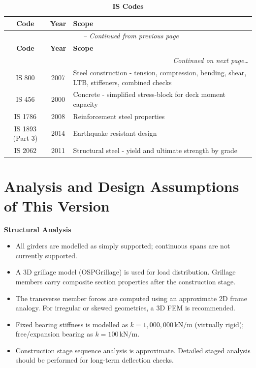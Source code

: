\documentclass[12pt,a4paper]{report}
\numberwithin{table}{chapter}
\numberwithin{figure}{chapter}
\begin{document}
\begingroup
\setlength{\tabcolsep}{3.5pt}
\begin{longtable}{|c|c|p{12cm}|}
\caption{\textbf{IS Codes}}\label{tab:is-codes}\\
\hline
\textbf{Code} & \textbf{Year} & \textbf{Scope} \\[6pt]
\hline
\endfirsthead

\multicolumn{3}{c}{\small\textit{\tablename\ \thetable{} -- Continued from previous page}} \\[4pt]
\hline
\textbf{Code} & \textbf{Year} & \textbf{Scope} \\[6pt]
\hline
\endhead

\hline
\multicolumn{3}{|r|}{\footnotesize\textit{Continued on next page\dots}} \\
\hline
\endfoot

\hline
\endlastfoot

IS 800 & 2007 & Steel construction - tension, compression, bending, shear, LTB, stiffeners, combined checks \\
\hline
IS 456 & 2000 & Concrete - simplified stress-block for deck moment capacity \\
\hline
IS 1786 & 2008 & Reinforcement steel properties \\
\hline
IS 1893 (Part 3) & 2014 & Earthquake resistant design \\
\hline
IS 2062 & 2011 & Structural steel - yield and ultimate strength by grade \\
\end{longtable}

\endgroup

\clearpage
\section{Analysis and Design Assumptions of This Version}
\label{sec:assumptions}

\textbf{Structural Analysis}

\begin{itemize}
    \item All girders are modelled as simply supported; continuous spans are not currently supported.
    \item A 3D grillage model (OSPGrillage) is used for load distribution. Grillage members carry composite section properties after the construction stage.
    \item The transverse member forces are computed using an approximate 2D frame analogy. For irregular or skewed geometries, a 3D FEM is recommended.
    \item Fixed bearing stiffness is modelled as $k = 1{,}000{,}000 \,\text{kN/m}$ (virtually rigid); free/expansion bearing as $k = 100 \, \text{kN/m}$.
    \item Construction stage sequence analysis is approximate. Detailed staged analysis should be performed for long-term deflection checks.
\end{itemize}
\end{document}
